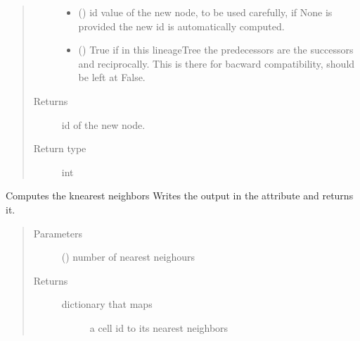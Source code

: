 \documentclass[letterpaper,10pt,english]{sphinxmanual}
\begin{document}
\begin{fulllineitems}
\begin{fulllineitems}
\begin{quote}
\begin{description}
\begin{itemize}
\item {} 
 () \textendash{} id value of the new node, to be used carefully,
if None is provided the new id is automatically computed.

\item {} 
 () \textendash{} True if in this lineageTree the predecessors are the successors and reciprocally.
This is there for bacward compatibility, should be left at False.

\end{itemize}

\item[{Returns}] \leavevmode
id of the new node.

\item[{Return type}] \leavevmode
int

\end{description}\end{quote}

\end{fulllineitems}


\begin{fulllineitems}
\label{\detokenize{index:LineageTree.lineageTree.compute_k_nearest_neighbours}}
Computes the k\sphinxhyphen{}nearest neighbors
Writes the output in the attribute 
and returns it.
\begin{quote}\begin{description}
\item[{Parameters}] \leavevmode
{} () \textendash{} number of nearest neighours

\item[{Returns}] \leavevmode
\begin{description}
\item[{dictionary that maps}] \leavevmode
a cell id to its  nearest neighbors

\end{description}



\end{description}
\end{quote}
\end{fulllineitems}
\end{fulllineitems}
\end{document}
